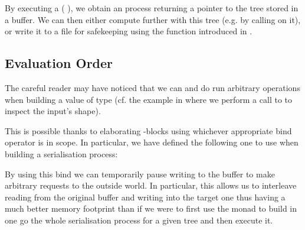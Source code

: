 
By executing a (  ), we
obtain an  process returning a pointer to the tree 
stored in a buffer.
%
We can then either compute further with this tree (e.g. by calling
 on it), or write it to a file for safekeeping
using the function 
introduced in .

\subsection{Evaluation Order}

The careful reader may have noticed that we can and do run arbitrary 
operations when building a value of type 
(cf. the  example in  where we perform
a call to  to inspect the input's shape).

This is possible thanks to \idris{} elaborating -blocks using
whichever appropriate bind operator is in scope. In particular, we have defined
the following one to use when building a serialisation process:


By using this bind we can temporarily pause writing to the buffer to make
arbitrary  requests to the outside world.
%
In particular, this allows us to interleave reading from the original buffer
and writing into the target one thus having a much better memory footprint than
if we were to first use the  monad to build in one go the whole
serialisation process for a given tree and then execute it.
